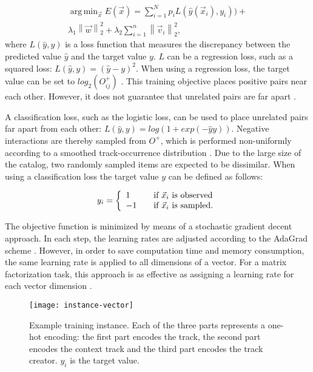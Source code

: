 \documentclass[twocolumn]{article}
\newcommand{\norm}[1]{\left\lVert#1\right\rVert}
\DeclareMathOperator*{\argmin}{arg\,min}
\begin{document}
\begin{equation} \label{eq:obj}
 \begin{split}
\argmin_{\vec{x}}
	E(\vec{x})= \sum_{i=1}^N p_i L(\hat{y}(\vec{x}_i), y_i)) + \\
	\lambda_1 \norm{\vec{w}}^2_2 +
	\lambda_2 \sum_{i=1}^n \norm{\vec{v}_i}^2_2,
\end{split}
\end{equation}
where $L(\hat{y},y)$ is a loss function that measures the discrepancy between the predicted value $\hat{y}$ and the target value $y$. $L$ can be a regression loss, such as a squared loss: $L(\hat{y},y) = (\hat{y} - y)^2$. When using a regression loss, the target value can be set to $log_2(O^+_{ij})$ \cite{glove}. This training objective places positive pairs near each other. However, it does not guarantee that unrelated pairs are far apart \cite{swivel}. 

A classification loss, such as the logistic loss, can be used to place unrelated pairs far apart from each other: $L(\hat{y},y) = log(1 + exp(-\hat{y}y))$. Negative interactions are thereby sampled from $O^+$, which is performed non-uniformly according to a smoothed track-occurrence distribution \cite{word2vec}. Due to the large size of the catalog, two randomly sampled items are expected to be dissimilar. When using a classification loss the target value $y$ can be defined as follows:

\begin{equation}
	y_i = \left\{
		\begin{array}{l l}
			1 & \quad \mbox{if $\vec{x}_i$ is observed}\\
			-1 & \quad \mbox{if $\vec{x}_i$ is sampled.}\\
		\end{array}
		\right.
\end{equation}

The objective function is minimized by means of a stochastic gradient decent approach. In each step, the learning rates are adjusted according to the AdaGrad scheme \cite{adagrad}. However, in order to save computation time and memory consumption, the same learning rate is applied to all dimensions of a vector. For a matrix factorization task, this approach is as effective as assigning a learning rate for each vector dimension \cite{mf-adagrad}.

\begin{figure}[t]
  \centering
  \texttt{[image: instance-vector]}
  \caption{Example training instance. Each of the three parts represents a one-hot encoding: the first part encodes the track, the second part encodes the context track and the third part encodes the track creator. $y_i$ is the target value.}
  \label{fig:instance-vector}
\end{figure}
\end{document}
